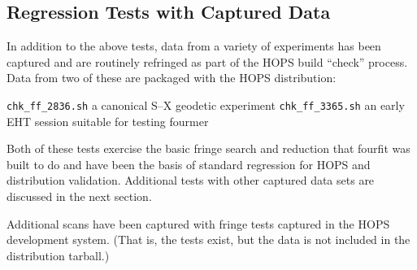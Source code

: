 
\subsection{Regression Tests with Captured Data}
\label{sec:captdatareq}

In addition to the above tests, data from a variety of experiments
has been captured and are routinely refringed as part of the
\ac{HOPS} build ``check'' process.  Data from two of
these are packaged with the \ac{HOPS} distribution:

\begin{description}
 \texttt{chk\_ff\_2836.sh} a canonical S--X geodetic experiment
 \texttt{chk\_ff\_3365.sh} an early \ac{EHT} session suitable for
    testing \ac{fourmer}
\end{description}
Both of these tests exercise the basic fringe search and reduction
that \acs{fourfit} was built to do and have been the basis of standard
regression for \ac{HOPS} and distribution validation.   Additional tests
with other captured data sets are discussed in the next section.







Additional scans have been captured with fringe tests captured
in the \ac{HOPS} development system.  (That is, the tests exist,
but the data is not included in the distribution tarball.)

